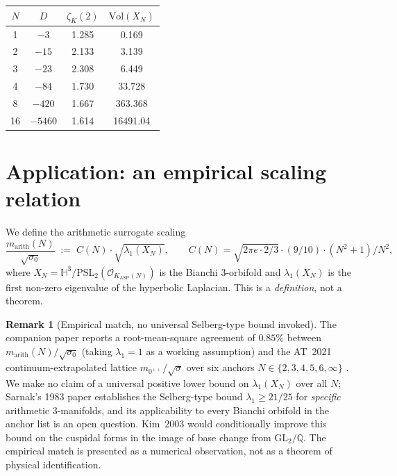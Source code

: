 \documentclass[11pt]{article}
\theoremstyle{definition}
\newtheorem{remark}{Remark}
\begin{document}
\begin{center}
\begin{tabular}{cccc}
$N$ & $D$ & $\zeta_K(2)$ & $\mathrm{Vol}(X_N)$ \\
\hline
1 & $-3$ & 1.285 & 0.169 \\
2 & $-15$ & 2.133 & 3.139 \\
3 & $-23$ & 2.308 & 6.449 \\
4 & $-84$ & 1.730 & 33.728 \\
8 & $-420$ & 1.667 & 363.368 \\
16 & $-5460$ & 1.614 & 16491.04 \\
\end{tabular}
\end{center}

\section{Application: an empirical scaling relation}\label{sec:scaling}

We define the arithmetic surrogate scaling
\[
\frac{m_{\mathrm{arith}}(N)}{\sqrt{\sigma_0}} \;:=\; C(N) \cdot \sqrt{\lambda_1(X_N)},
\qquad
C(N) = \sqrt{2\pi e \cdot 2/3} \cdot (9/10) \cdot (N^2+1)/N^2,
\]
where $X_N = \mathbb{H}^3 / \mathrm{PSL}_2(\mathcal{O}_{K_{\mathrm{ASP}}(N)})$ is the Bianchi $3$-orbifold and $\lambda_1(X_N)$ is the first non-zero eigenvalue of the hyperbolic Laplacian. This is a \emph{definition}, not a theorem.

\begin{remark}[Empirical match, no universal Selberg-type bound invoked]
The companion paper \cite{Remondiere2026PRL} reports a root-mean-square agreement of $0.85\%$ between $m_{\mathrm{arith}}(N)/\sqrt{\sigma_0}$ (taking $\lambda_1 = 1$ as a working assumption) and the AT~2021 continuum-extrapolated lattice $m_{0^{++}}/\sqrt{\sigma}$ over six anchors $N \in \{2,3,4,5,6,\infty\}$ \cite{AT2021}. We make no claim of a universal positive lower bound on $\lambda_1(X_N)$ over all $N$; Sarnak's 1983 paper \cite{Sarnak1983} establishes the Selberg-type bound $\lambda_1 \geq 21/25$ for \emph{specific} arithmetic 3-manifolds, and its applicability to every Bianchi orbifold in the anchor list is an open question. Kim~2003 \cite{Kim2003} would conditionally improve this bound on the cuspidal forms in the image of base change from $\mathrm{GL}_2/\mathbb{Q}$. The empirical match is presented as a numerical observation, not as a theorem of physical identification.
\end{remark}
\end{document}
